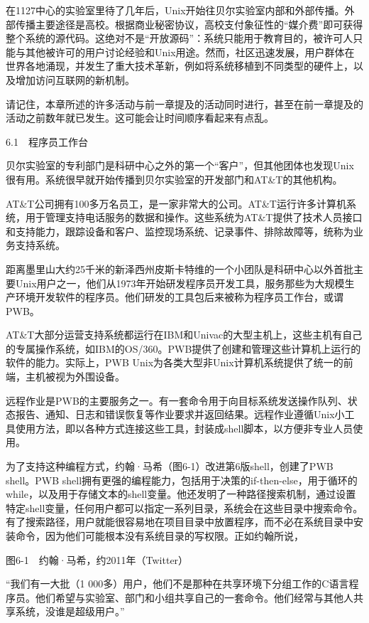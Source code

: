 \documentclass[a4paper,12pt,UTF8,twoside]{ctexbook}
\begin{document}
在1127中心的实验室里待了几年后，Unix开始往贝尔实验室内部和外部传播。外部传播主要途径是高校。根据商业秘密协议，高校支付象征性的“媒介费”即可获得整个系统的源代码。这绝对不是“开放源码”：系统只能用于教育目的，被许可人只能与其他被许可的用户讨论经验和Unix用途。然而，社区迅速发展，用户群体在世界各地涌现，并发生了重大技术革新，例如将系统移植到不同类型的硬件上，以及增加访问互联网的新机制。

请记住，本章所述的许多活动与前一章提及的活动同时进行，甚至在前一章提及的活动之前数年就已发生。这可能会让时间顺序看起来有点乱。





6.1　程序员工作台


贝尔实验室的专利部门是科研中心之外的第一个“客户”，但其他团体也发现Unix很有用。系统很早就开始传播到贝尔实验室的开发部门和AT\&T的其他机构。

AT\&T公司拥有100多万名员工，是一家非常大的公司。AT\&T运行许多计算机系统，用于管理支持电话服务的数据和操作。这些系统为AT\&T提供了技术人员接口和支持能力，跟踪设备和客户、监控现场系统、记录事件、排除故障等，统称为业务支持系统。

距离墨里山大约25千米的新泽西州皮斯卡特维的一个小团队是科研中心以外首批主要Unix用户之一，他们从1973年开始研发程序员开发工具，服务那些为大规模生产环境开发软件的程序员。他们研发的工具包后来被称为程序员工作台，或谓PWB。

AT\&T大部分运营支持系统都运行在IBM和Univac的大型主机上，这些主机有自己的专属操作系统，如IBM的OS/360。PWB提供了创建和管理这些计算机上运行的软件的能力。实际上，PWB Unix为各类大型非Unix计算机系统提供了统一的前端，主机被视为外围设备。

远程作业是PWB的主要服务之一。有一套命令用于向目标系统发送操作队列、状态报告、通知、日志和错误恢复等作业要求并返回结果。远程作业遵循Unix小工具使用方法，即以各种方式连接这些工具，封装成shell脚本，以方便非专业人员使用。

为了支持这种编程方式，约翰·马希（图6-1）改进第6版shell，创建了PWB shell。PWB shell拥有更强的编程能力，包括用于决策的if-then-else，用于循环的while，以及用于存储文本的shell变量。他还发明了一种路径搜索机制，通过设置特定shell变量，任何用户都可以指定一系列目录，系统会在这些目录中搜索命令。有了搜索路径，用户就能很容易地在项目目录中放置程序，而不必在系统目录中安装命令，因为他们可能根本没有系统目录的写权限。正如约翰所说，



图6-1　约翰·马希，约2011年（Twitter）

“我们有一大批（1 000多）用户，他们不是那种在共享环境下分组工作的C语言程序员。他们希望与实验室、部门和小组共享自己的一套命令。他们经常与其他人共享系统，没谁是超级用户。”
\end{document}
